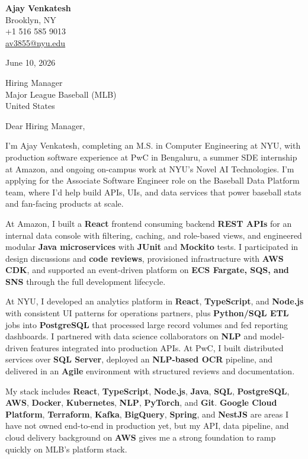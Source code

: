\documentclass[letterpaper,11pt]{article}
\begin{document}
\begin{flushleft}
\textbf{\large Ajay Venkatesh} \\
Brooklyn, NY \\
+1 516 585 9013 \\
\href{mailto:av3855@nyu.edu}{av3855@nyu.edu}
\end{flushleft}
\vspace{10pt}
June 10, 2026
\vspace{6pt}

Hiring Manager \\
Major League Baseball (MLB) \\
United States

\vspace{10pt}

Dear Hiring Manager,

I'm Ajay Venkatesh, completing an M.S. in Computer Engineering at NYU, with production software experience at PwC in Bengaluru, a summer SDE internship at Amazon, and ongoing on-campus work at NYU's Novel AI Technologies. I'm applying for the Associate Software Engineer role on the Baseball Data Platform team, where I'd help build APIs, UIs, and data services that power baseball stats and fan-facing products at scale.

At Amazon, I built a \textbf{React} frontend consuming backend \textbf{REST APIs} for an internal data console with filtering, caching, and role-based views, and engineered modular \textbf{Java microservices} with \textbf{JUnit} and \textbf{Mockito} tests. I participated in design discussions and \textbf{code reviews}, provisioned infrastructure with \textbf{AWS CDK}, and supported an event-driven platform on \textbf{ECS Fargate, SQS, and SNS} through the full development lifecycle.

At NYU, I developed an analytics platform in \textbf{React}, \textbf{TypeScript}, and \textbf{Node.js} with consistent UI patterns for operations partners, plus \textbf{Python/SQL ETL} jobs into \textbf{PostgreSQL} that processed large record volumes and fed reporting dashboards. I partnered with data science collaborators on \textbf{NLP} and model-driven features integrated into production APIs. At PwC, I built distributed services over \textbf{SQL Server}, deployed an \textbf{NLP-based OCR} pipeline, and delivered in an \textbf{Agile} environment with structured reviews and documentation.

My stack includes \textbf{React}, \textbf{TypeScript}, \textbf{Node.js}, \textbf{Java}, \textbf{SQL}, \textbf{PostgreSQL}, \textbf{AWS}, \textbf{Docker}, \textbf{Kubernetes}, \textbf{NLP}, \textbf{PyTorch}, and \textbf{Git}. \textbf{Google Cloud Platform}, \textbf{Terraform}, \textbf{Kafka}, \textbf{BigQuery}, \textbf{Spring}, and \textbf{NestJS} are areas I have not owned end-to-end in production yet, but my API, data pipeline, and cloud delivery background on \textbf{AWS} gives me a strong foundation to ramp quickly on MLB's platform stack.
\end{document}
